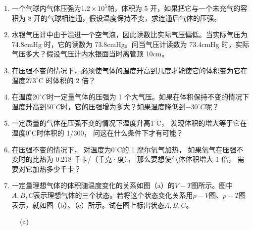 \begin{enumerate}
\def\labelenumi{\arabic{enumi}.}
\item
  一个气球内气体压强为\(1.2 \times 10^{5}\)帕，体积为 5
  开，如果把它与一个未充气的容积为 8
  开的气球相连通，假设温度保持不变，求连通后气体的压强。
\item
  水银气压计中由于混进一个空气泡，因此读数比实际气压偏低。当实际气压为
  74.8cmHg 时，它的读数为 73.8cmHg。问当气压计读数为 73.4cmHg
  时，实际气压多大？假设气压计内水银面当时离管顶 10cm。
\item
  在压强不变的情况下，必须使气体的温度升高到几度才能使它的体积变为它在温度\(273^{\circ}\)C
  时体积的 2 倍？
\item
  在温度\(20^{\circ}C\)时一定量气体的压强为 1
  个大气压。如果在体积保持不变的情况下温度升高到\(50^{\circ}C\)时，它的压强增为多大？如果温度降低到\(-30^{\circ}C\)呢？
\item
  一定质量的气体在压强不变的情况下温度升高\(1^{\circ} \mathrm{C}\)，
  发现体积的增大等于它在温度\(0^{\circ} \mathrm{C}\)时体积的 1/300，
  问这在什么条件下才有可能？
\item
  在压强不变的情况下， 对温度为\(0^{\circ} \mathrm{C}\)的 1
  摩尔氧气加热， 如果氧气在压强不变时的比热为 0.218 千卡/（千克·度），
  那么要想使气体体积增大 1 倍， 需要对它加热多少千卡？
\item
  一定量理想气体的体积随温度变化的关系如图（a）的\(V - T\)图所示。图中\(A, B, C\)表示理想气体的三个状态。若将这个状态变化关系用\(\rho - V\)图、\(p - T\)图表示，就如图（b）、（c）所示。试在图上标出状态\(A, B, C\)。
\end{enumerate}

\begin{figure}
\centering
{}
\caption{(a)}
\end{figure}


